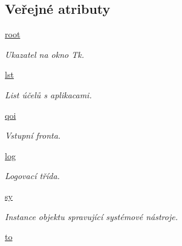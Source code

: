 \subsection*{Veřejné atributy}
\begin{DoxyCompactItemize}
\item 
\hypertarget{classmnFocus_1_1App_a6ae4c2d831003d43d843f73c6a00008f}{\hyperlink{classmnFocus_1_1App_a6ae4c2d831003d43d843f73c6a00008f}{root}}\label{db/d36/classmnFocus_1_1App_a6ae4c2d831003d43d843f73c6a00008f}

\begin{DoxyCompactList}\small\item\em Ukazatel na okno Tk. \end{DoxyCompactList}\item 
\hypertarget{classmnFocus_1_1App_a177090aa7fc8292124d8eb0a8ebbb065}{\hyperlink{classmnFocus_1_1App_a177090aa7fc8292124d8eb0a8ebbb065}{lst}}\label{db/d36/classmnFocus_1_1App_a177090aa7fc8292124d8eb0a8ebbb065}

\begin{DoxyCompactList}\small\item\em List účelů s aplikacami. \end{DoxyCompactList}\item 
\hypertarget{classmnFocus_1_1App_a63e64c91bb4dd8d254f6bcc9c44963ad}{\hyperlink{classmnFocus_1_1App_a63e64c91bb4dd8d254f6bcc9c44963ad}{qoi}}\label{db/d36/classmnFocus_1_1App_a63e64c91bb4dd8d254f6bcc9c44963ad}

\begin{DoxyCompactList}\small\item\em Vstupní fronta. \end{DoxyCompactList}\item 
\hypertarget{classmnFocus_1_1App_a8d91f2dec14a1e1e6f12ed93df8d8eeb}{\hyperlink{classmnFocus_1_1App_a8d91f2dec14a1e1e6f12ed93df8d8eeb}{log}}\label{db/d36/classmnFocus_1_1App_a8d91f2dec14a1e1e6f12ed93df8d8eeb}

\begin{DoxyCompactList}\small\item\em Logovací třída. \end{DoxyCompactList}\item 
\hypertarget{classmnFocus_1_1App_a8325d418dcc46c36b37fc7160d0291fb}{\hyperlink{classmnFocus_1_1App_a8325d418dcc46c36b37fc7160d0291fb}{sy}}\label{db/d36/classmnFocus_1_1App_a8325d418dcc46c36b37fc7160d0291fb}

\begin{DoxyCompactList}\small\item\em Instance objektu spravující systémové nástroje. \end{DoxyCompactList}\item 
\hypertarget{classmnFocus_1_1App_a209aa8da6fd82207270aafc52ec9012a}{\hyperlink{classmnFocus_1_1App_a209aa8da6fd82207270aafc52ec9012a}{to}}\label{db/d36/classmnFocus_1_1App_a209aa8da6fd82207270aafc52ec9012a}


\end{DoxyCompactItemize}
